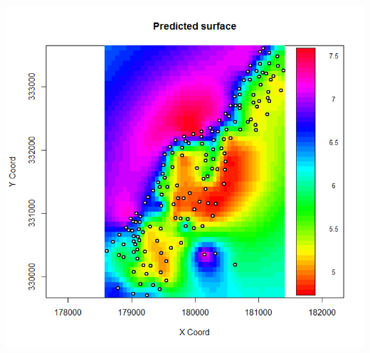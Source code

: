\documentclass[parskip,12pt]{beamer}
\begin{document}
\begin{frame}
\begin{columns}
\begin{column}{0.5\textwidth}
\begin{center}
     \includegraphics[width=\textwidth]{MeuseSurface}
          \end{center}
\end{column}
\end{columns}
\end{frame}
\end{document}
